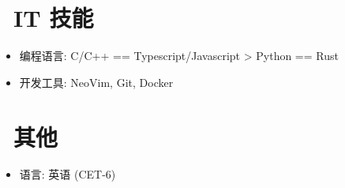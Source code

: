\documentclass{resume}
\begin{document}


\section{\faCogs\ IT 技能}
\begin{itemize}[parsep=0.5ex]
  \item 编程语言: C/C++ == Typescript/Javascript > Python == Rust
  \item 开发工具: NeoVim, Git, Docker
\end{itemize}


\section{\faInfo\ 其他}
\begin{itemize}[parsep=0.5ex]
  \item 语言: 英语 (CET-6)
\end{itemize}

%
%
\end{document}
